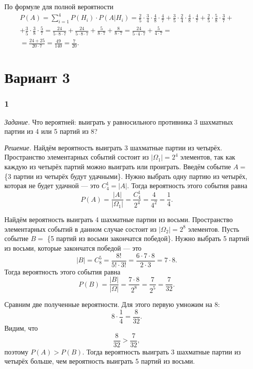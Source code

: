По формуле для полной вероятности
\begin{equation*}
\begin{split}
P \left( A \right) =
\sum \limits_{i=1}^4 P \left( H_i \right) \cdot P \left( \left. A \right| H_i \right) =
\frac{2}{5} \cdot \frac{3}{4} \cdot \frac{4}{8} \cdot \frac{4}{7} +
\frac{3}{5} \cdot \frac{2}{4} \cdot \frac{4}{8} \cdot \frac{4}{7} + \frac{2}{5} \cdot \frac{5}{8} \cdot \frac{3}{7} +  \\
+ \frac{3}{5} \cdot \frac{3}{8} \cdot \frac{5}{7} =
\frac{24}{5 \cdot 8 \cdot 7} + \frac{24}{5 \cdot 8 \cdot 7} + \frac{5}{8 \cdot 7} + \frac{8}{8 \cdot 7} =
\frac{24}{5 \cdot 4 \cdot 7} + \frac{5}{4 \cdot 7} = \\
= \frac{24 + 25}{20 \cdot 7} =
\frac{49}{140} =
\frac{7}{20}.
\end{split}
\end{equation*}

\section*{Вариант 3}

\subsubsection*{1}

\textit{Задание.} Что вероятней: выиграть у равносильного противника 3 шахматных партии из 4 или 5 партий из 8?

\textit{Решение.} Найдём вероятность выиграть 3 шахматные партии из четырёх.
Пространство элементарных событий состоит из $ \left| \Omega_1 \right| = 2^4$ элементов,
так как каждую из четырёх партий можно выиграть или проиграть.
Введём событие $A =$ \{3 партии из четырёх будут удачными\}.
Нужно выбрать одну партию из четырёх, которая не будет удачной --- это $C_4^1 = \left| A \right| $.
Тогда вероятность этого события равна
$$P \left( A \right) =
\frac{ \left| A \right| }{ \left| \Omega_1 \right| } =
\frac{C_4^1}{2^4} =
\frac{4}{4^2} =
\frac{1}{4}.$$

Найдём вероятность выиграть 4 шахматные партии из восьми.
Пространство элементарных событий в данном случае состоит из $ \left| \Omega_2 \right| = 2^8$ элементов.
Пусть событие $B =$ \{5 партий из восьми закончатся победой\}.
Нужно выбрать 5 партий из восьми, которые закончатся победой --- это
$$ \left| B \right| =
C_8^5 =
\frac{8!}{5! \cdot 3!} =
\frac{6 \cdot 7 \cdot 8}{2 \cdot 3} =
7 \cdot 8.$$
Тогда вероятность этого события равна
$$P \left( B \right) =
\frac{ \left| B \right| }{ \left| \Omega \right| } =
\frac{7  \cdot 8}{2^8} =
\frac{7}{2^5} =
\frac{7}{32}.$$

Сравним две полученные вероятности.
Для этого первую умножим на 8:
$$8 \cdot \frac{1}{4} =
\frac{8}{32}.$$
Видим, что
$$ \frac{8}{32} > \frac{7}{32},$$
поэтому $P \left( A \right) > P \left( B \right) $.
Тогда вероятность выиграть 3 шахматные партии из четырёх больше, чем вероятность выиграть 5 партий из восьми.
